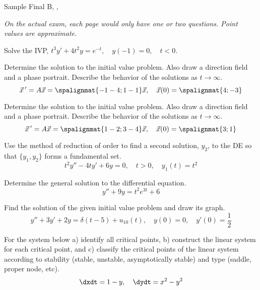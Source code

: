 \documentclass[12pt]{exam}
\newcommand{\TestName}{Sample Final B}
\begin{document}
    


\newpage
    
    \begin{center}
    {\Large \TestName, \Course, \Semester \ \Year}
    \end{center}
    
\vspace{1cm} 
    



\newpage 
\textit{On the actual exam, each page would only have one or two questions. Point values are approximate.} 

\begin{questions}

    \question[5] %
    Solve the IVP, $t^3 y' + 4t^2 y = e^{-t}, \quad y(-1) = 0 , \quad t<0$.
    

    
    \question[10] %
    Determine the solution to the initial value problem. Also draw a direction field and a phase portrait. Describe the behavior of the solutions as $t \to \infty$.
    $$ \vec x \, ' = A \vec x = \spalignmat{-1 -4 ;1 -1}\vec x, \quad \vec x(0) = \spalignmat{4;-3}$$
    
    
    \question[10] %
    Determine the solution to the initial value problem. Also draw a direction field and a phase portrait. Describe the behavior of the solutions as $t \to \infty$.
    $$ \vec x \, ' = A \vec x = \spalignmat{1 -2;3 -4}\vec x, \quad \vec x(0) = \spalignmat{3;1}$$
    
    
    \question[10] %
    Use the method of reduction of order to find a second solution, $y_2$, to the DE so that $\{y_1,y_2\}$ forms a fundamental set. 
    $$t^2 y'' -4t y' + 6y = 0, \quad t>0, \quad y_1(t) = t^2$$
        
    \question[10] %
    Determine the general solution to the differential equation. 
    $$y'' + 9y = t^2 e^{3t} + 6$$
    
    \question[10] %
    Find the solution of the given initial value problem and draw its graph.
    $$y'' +3y' +2y = \delta (t-5)+ u_{10}(t), \quad y(0) = 0, \quad y'(0) = \frac 1 2$$
    
    \question[10] %
    For the system below a) identify all critical points, b) construct the linear system for each critical point, and c) classify the critical points of the linear system according to stability (stable, unstable, asymptotically stable) and type (saddle, proper node, etc). 
    $$\dxdt = 1 - y, \quad \dydt = x^2 - y^2$$
    

\end{questions}
\end{document}
